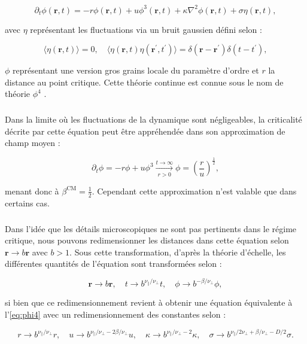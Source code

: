 \begin{equation}
	\partial_t \phi (\mathbf{r}, t) = -r\phi (\mathbf{r}, t) + u \phi^3(\mathbf{r}, t) + \kappa\nabla^2 \phi (\mathbf{r}, t) + \sigma\eta(\mathbf{r}, t),
\end{equation}

\noindent avec $\eta$ représentant les fluctuations via un bruit gaussien défini selon :

\begin{equation}
\langle \eta(\mathbf{r}, t) \rangle = 0, \quad \langle \eta(\mathbf{r}, t) \eta(\mathbf{r}^\prime, t^\prime)\rangle = \delta(\mathbf{r}-\mathbf{r}^\prime)\delta(t-t^\prime),
\label{eq:phi4}
\end{equation}

\noindent $\phi$ représentant une version gros grains locale du paramètre d'ordre et $r$ la distance au point critique. Cette théorie continue est connue sous le nom de théorie $\phi^4$ \cite{kardar_statistical_2007}.

\subparagraph{}Dans la limite où les fluctuations de la dynamique sont négligeables, la criticalité décrite par cette équation peut être appréhendée dans son approximation de champ moyen :

\begin{equation}
	\partial_t \phi = -r\phi + u\phi^3 \xrightarrow[r>0]{t\rightarrow \infty} \phi = \left( \frac{r}{u} \right)^\frac{1}{2},
\end{equation}

\noindent menant donc à $\beta^\text{CM} = \frac{1}{2}$. Cependant cette approximation n'est valable que dans certains cas.

\subparagraph{}Dans l'idée que les détails microscopiques ne sont pas pertinents dans le régime critique, nous pouvons redimensionner les distances dans cette équation selon $\mathbf{r}\rightarrow b\mathbf{r}$ avec $b>1$. Sous cette transformation, d'après la théorie d'échelle, les différentes quantités de l'équation sont transformées selon :

\begin{equation}
	\mathbf{r}\rightarrow b\mathbf{r}, \quad t \rightarrow b^{\nu_\parallel/\nu_\perp}t, \quad \phi \rightarrow b^{-\beta/\nu_\perp}\phi,
\end{equation}

\noindent si bien que ce redimensionnement revient à obtenir une équation équivalente à l'\autoref{eq:phi4} avec un redimensionnement des constantes selon :

\begin{equation}
	r \rightarrow b^{\nu_\parallel/\nu_\perp} r, \quad u \rightarrow b^{\nu_\parallel/\nu_\perp - 2\beta/\nu_\perp} u, \quad \kappa \rightarrow b^{\nu_\parallel/\nu_\perp-2}\kappa, \quad \sigma \rightarrow b^{\nu_\parallel/2\nu_\perp+\beta/\nu_\perp - D/2}\sigma.
\end{equation}

